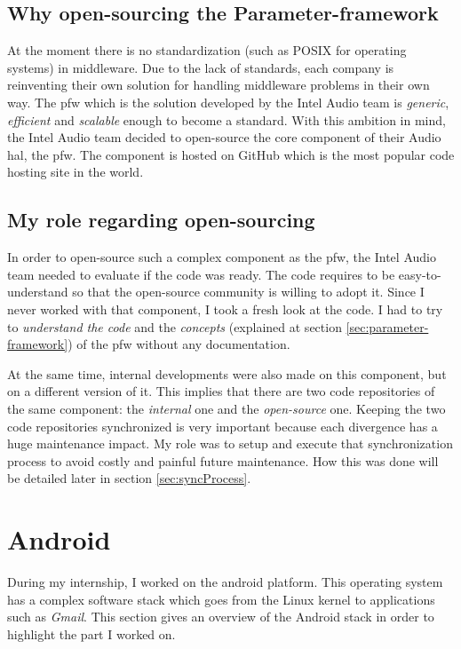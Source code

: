 \subsection{Why open-sourcing the Parameter-framework}\label{sec:whyOpensourcing}
At the moment there is no standardization (such as POSIX for operating systems) in middleware. Due to the lack
of standards, each company is reinventing their own solution for handling middleware problems in their own way.
The \gls{pfw} which is the solution developed by the Intel Audio team is \emph{generic}, \emph{efficient} and \emph{scalable} enough to become a standard.
With this ambition in mind, the Intel Audio team decided to open-source the core component of their Audio \gls{hal}, the \gls{pfw}.
The component is hosted on \gls{GitHub} which is the most popular code hosting site in the world.

\subsection{My role regarding open-sourcing}
In order to open-source such a complex component as the \gls{pfw}, the Intel Audio team needed to evaluate if the code was ready.
The code requires to be easy-to-understand so that the open-source community is willing to adopt it.
Since I never worked with that component, I took a fresh look at the code. I had to try to \emph{understand the code} and the
\emph{concepts} (explained at section \ref{sec:parameter-framework}) of the \gls{pfw} without any documentation.

At the same time, internal developments were also made on this component, but on a different version of it.
This implies that there are two code repositories of the same component: the \emph{internal} one and the \emph{open-source} one.
Keeping the two code repositories synchronized is very important because each divergence has a huge maintenance impact.
My role was to setup and execute that synchronization process to avoid costly and painful future maintenance.
How this was done will be detailed later in section \ref{sec:syncProcess}.



\section{Android}
During my internship, I worked on the \gls{android} platform. This operating
system has a complex software stack which goes from the Linux \gls{kernel} to
applications such as \emph{Gmail}. This section gives an overview of the Android
stack in order to highlight the part I worked on.

